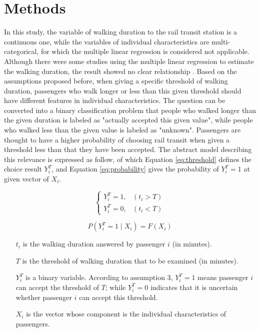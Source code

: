 \documentclass[sustainability,article,submit,moreauthors,pdftex,10pt,a4paper]{Definitions/mdpi}
\begin{document}
\section{Methods}
%
In this study, the variable of walking duration to the rail transit station is a continuous one, while the variables of individual characteristics are multi-categorical, for which the multiple linear regression is considered not applicable. Although there were some studies using the multiple linear regression to estimate the walking duration, the result showed no clear relationship \cite{krygsman2004multimodal}. Based on the assumptions proposed before, when giving a specific threshold of walking duration, passengers who walk longer or less than this given threshold should have different features in individual characteristics. The question can be converted into a binary classification problem that people who walked longer than the given duration is labeled as "actually accepted this given value", while people who walked less than the given value is labeled as "unknown". Passengers are thought to have a higher probability of choosing rail transit when given a threshold less than that they have been accepted. The abstract model describing this relevance is expressed as follow, of which Equation \ref{eq:threshold} defines the choice result $Y^T_i$, and Equation \ref{eq:probability} gives the probability of $Y^T_i=1$ at given vector of $X_i$.

\begin{equation}
\left\{\begin{matrix}
Y^T_i=1,&(t_i>T) \\
Y^T_i=0,&(t_i<T)
\end{matrix}\right.
\label{eq:threshold}
\end{equation}

\begin{equation}
P(Y^T_i=1 \mid X_i)=F(X_i)
\label{eq:probability}
\end{equation}

%
\begin{enumerate}
	\item[$t_i$] is the walking duration answered by passenger $i$ (in minutes).
	\item[$T$] is the threshold of walking duration that to be examined (in minutes).
	\item[$Y^T_i$] is a binary variable. According to assumption 3, $Y^T_i=1$ means passenger $i$ can accept the threshold of $T$; while $Y^T_i=0$ indicates that it is uncertain whether passenger $i$ can accept this threshold.
	\item[$X_i$] is the vector whose component is the individual characteristics of passengers.
\end{enumerate}
\end{document}
